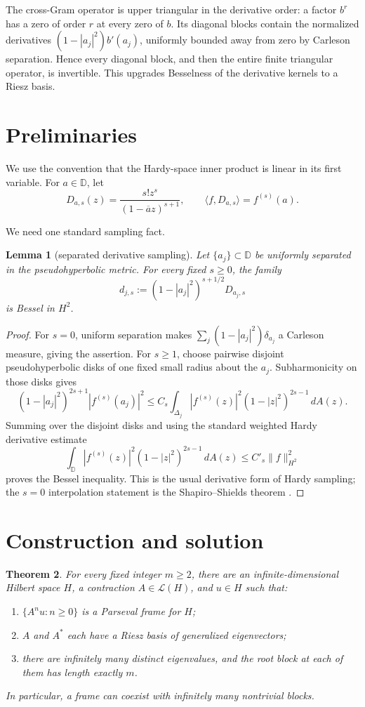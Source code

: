 \documentclass[11pt]{article}
\newtheorem{theorem}{Theorem}
\newtheorem{lemma}[theorem]{Lemma}
\theoremstyle{remark}
\newcommand{\D}{\mathbb D}
\begin{document}
The cross-Gram operator is upper triangular in the derivative order: a factor
\(b^r\) has a zero of order \(r\) at every zero of \(b\). Its diagonal blocks
contain the normalized derivatives
\((1-|a_j|^2)b'(a_j)\), uniformly bounded away from zero by Carleson
separation. Hence every diagonal block, and then the entire finite triangular
operator, is invertible. This upgrades Besselness of the derivative kernels
to a Riesz basis.

\section{Preliminaries}

We use the convention that the Hardy-space inner product is linear in its
first variable. For \(a\in\D\), let
\[
 D_{a,s}(z)=\frac{s!z^s}{(1-\overline a z)^{s+1}},
 \qquad \langle f,D_{a,s}\rangle=f^{(s)}(a).
\]

We need one standard sampling fact.

\begin{lemma}[separated derivative sampling]\label{lem:bessel}
Let \(\{a_j\}\subset\D\) be uniformly separated in the pseudohyperbolic
metric. For every fixed \(s\ge0\), the family
\[
 d_{j,s}:=(1-|a_j|^2)^{s+1/2}D_{a_j,s}
\]
is Bessel in \(H^2\).
\end{lemma}

\begin{proof}
For \(s=0\), uniform separation makes
\(\sum_j(1-|a_j|^2)\delta_{a_j}\) a Carleson measure, giving the assertion.
For \(s\ge1\), choose pairwise disjoint pseudohyperbolic disks of one fixed
small radius about the \(a_j\). Subharmonicity on those disks gives
\[
 (1-|a_j|^2)^{2s+1}|f^{(s)}(a_j)|^2
 \le C_s\int_{\Delta_j}|f^{(s)}(z)|^2
                   (1-|z|^2)^{2s-1}\,dA(z).
\]
Summing over the disjoint disks and using the standard weighted Hardy
derivative estimate
\[
 \int_\D |f^{(s)}(z)|^2(1-|z|^2)^{2s-1}\,dA(z)
 \le C'_s\|f\|_{H^2}^2
\]
proves the Bessel inequality. This is the usual derivative form of Hardy
sampling; the \(s=0\) interpolation statement is the
Shapiro--Shields theorem \cite{ShapiroShields}.
\end{proof}

\section{Construction and solution}

\begin{theorem}\label{thm:main}
For every fixed integer \(m\ge2\), there are an infinite-dimensional Hilbert
space \(H\), a contraction \(A\in\mathcal L(H)\), and \(u\in H\) such that:
\begin{enumerate}
 \item \(\{A^n u:n\ge0\}\) is a Parseval frame for \(H\);
 \item \(A\) and \(A^*\) each have a Riesz basis of generalized eigenvectors;
 \item there are infinitely many distinct eigenvalues, and the root block at
 each of them has length exactly \(m\).
\end{enumerate}
In particular, a frame can coexist with infinitely many nontrivial blocks.
\end{theorem}
\end{document}
